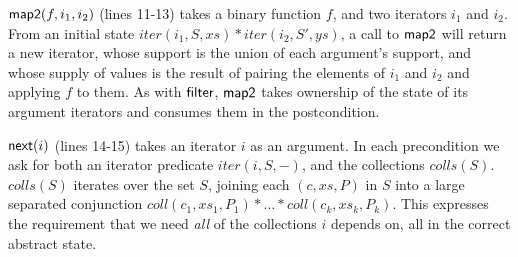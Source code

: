 \documentclass[preprint,natbib]{sigplanconf}
\begin{document}
$\mbox{\textsf{{map2}}}(f, i_1, i_2)$ (lines 11-13) takes a binary function $f$,
and two iterators $i_1$ and $i_2$. From an initial state $iter(i_1, S,
xs) * iter(i_2, S', ys)$, a call to $\mbox{\textsf{{map2}}}$ will return a new
iterator, whose support is the union of each argument's support, and
whose supply of values is the result of pairing the elements of $i_1$
and $i_2$ and applying $f$ to them. As with $\mbox{\textsf{{filter}}}$,
$\mbox{\textsf{{map2}}}$ takes ownership of the state of its argument iterators
and consumes them in the postcondition.

$\mbox{\textsf{{next}}}(i)$ (lines 14-15) takes an iterator $i$ as an argument.
In each precondition we ask for both an iterator predicate $iter(i, S,
-)$, and the collections $colls(S)$. $colls(S)$ iterates over the set
$S$, joining each $(c,xs,P)$ in $S$ into a large separated conjunction
$coll(c_1, xs_1, P_1) * \ldots * coll(c_k, xs_k, P_k)$. This expresses
the requirement that we need \emph{all} of the collections $i$ depends
on, all in the correct abstract state.
\end{document}
